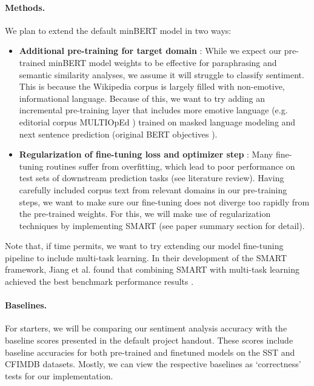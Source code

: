 \documentclass{article}
\begin{document}

\paragraph{Methods.}
We plan to extend the default minBERT model in two ways:

\begin{itemize}
    \item \textbf{Additional pre-training for target domain} \cite{pretrain}: While we expect our pre-trained minBERT model weights to be effective for paraphrasing and semantic similarity analyses, we assume it will struggle to classify sentiment. This is because the Wikipedia corpus is largely filled with non-emotive, informational language. Because of this, we want to try adding an incremental pre-training layer that includes more emotive language (e.g. editorial corpus MULTIOpEd \cite{multioped}) trained on masked language modeling and next sentence prediction (original BERT objectives \cite{bert}). 
    
    \item \textbf{Regularization of fine-tuning loss and optimizer step} \cite{smart}: Many fine-tuning routines suffer from overfitting, which lead to poor performance on test sets of downstream prediction tasks (see literature review). Having carefully included corpus text from relevant domains in our pre-training steps, we want to make sure our fine-tuning does not diverge too rapidly from the pre-trained weights. For this, we will make use of regularization techniques by implementing SMART (see paper summary section for detail).

\end{itemize}

    Note that, if time permits, we want to try extending our model fine-tuning pipeline to include multi-task learning. In their development of the SMART framework, Jiang et al. found that combining SMART with multi-task learning achieved the best benchmark performance results \cite{smart}.
    



\paragraph{Baselines.}
For starters, we will be comparing our sentiment analysis accuracy with the baseline scores presented in the default project handout. These scores include baseline accuracies for both pre-trained and finetuned models on the SST and CFIMDB datasets. Mostly, we can view the respective baselines as `correctness' tests for our implementation. 
\end{document}
